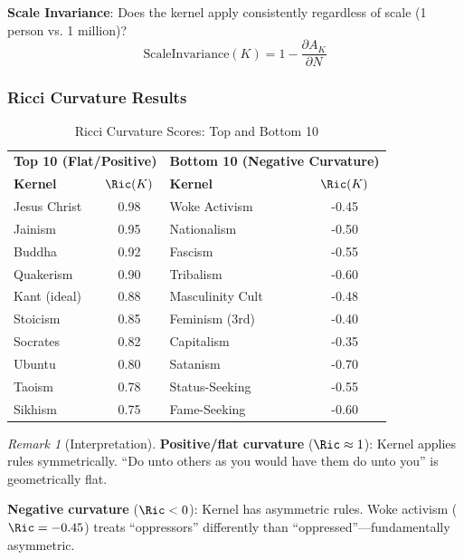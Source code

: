 \documentclass[11pt,a4paper]{article}
\theoremstyle{definition}
\theoremstyle{remark}
\newtheorem{remark}{Remark}
\begin{document}
\textbf{Scale Invariance}: Does the kernel apply consistently regardless of scale (1 person vs. 1 million)?
\begin{equation}
    \text{ScaleInvariance}(K) = 1 - \frac{\partial A_K}{\partial N}
\end{equation}

\subsubsection{Ricci Curvature Results}

\begin{table}[H]
\centering
\caption{Ricci Curvature Scores: Top and Bottom 10}
\label{tab:ricci-results}
\begin{tabular}{@{}lc|lc@{}}
\toprule
\multicolumn{2}{c|}{\textbf{Top 10 (Flat/Positive)}} & \multicolumn{2}{c}{\textbf{Bottom 10 (Negative Curvature)}} \\
\textbf{Kernel} & $\Ric(K)$ & \textbf{Kernel} & $\Ric(K)$ \\
\midrule
Jesus Christ & 0.98 & Woke Activism & -0.45 \\
Jainism & 0.95 & Nationalism & -0.50 \\
Buddha & 0.92 & Fascism & -0.55 \\
Quakerism & 0.90 & Tribalism & -0.60 \\
Kant (ideal) & 0.88 & Masculinity Cult & -0.48 \\
Stoicism & 0.85 & Feminism (3rd) & -0.40 \\
Socrates & 0.82 & Capitalism & -0.35 \\
Ubuntu & 0.80 & Satanism & -0.70 \\
Taoism & 0.78 & Status-Seeking & -0.55 \\
Sikhism & 0.75 & Fame-Seeking & -0.60 \\
\bottomrule
\end{tabular}
\end{table}

\begin{remark}[Interpretation]
\textbf{Positive/flat curvature} ($\Ric \approx 1$): Kernel applies rules symmetrically. ``Do unto others as you would have them do unto you'' is geometrically flat.

\textbf{Negative curvature} ($\Ric < 0$): Kernel has asymmetric rules. Woke activism ($\Ric = -0.45$) treats ``oppressors'' differently than ``oppressed''---fundamentally asymmetric.
\end{remark}

\end{document}
